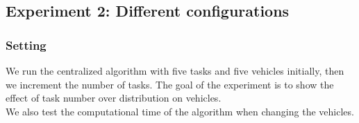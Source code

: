 \documentclass[10.5pt]{article}
\begin{document}
\subsection{Experiment 2: Different configurations}

\subsubsection{Setting}
We run the centralized algorithm with five tasks and five vehicles initially, then we increment the number of tasks.
The goal of the experiment is to show the effect of task number over distribution on vehicles.\\
We also test the computational time of the algorithm when changing the vehicles. 
\end{document}
